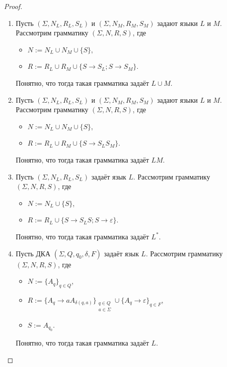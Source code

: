 \documentclass[12pt,a4paper]{article}
\begin{document}
    \begin{proof}
        \begin{enumerate}
            \item Пусть $(\Sigma, N_L, R_L, S_L)$ и $(\Sigma, N_M, R_M, S_M)$ задают языки $L$ и $M$. Рассмотрим грамматику $(\Sigma, N, R, S)$, где
                \begin{itemize}
                    \item $N := N_L \cup N_M \cup \{S\}$,
                    \item $R := R_L \cup R_M \cup \{S \to S_L; S \to S_M\}$.
                \end{itemize}
                Понятно, что тогда такая грамматика задаёт $L \cup M$.
            \item Пусть $(\Sigma, N_L, R_L, S_L)$ и $(\Sigma, N_M, R_M, S_M)$ задают языки $L$ и $M$. Рассмотрим грамматику $(\Sigma, N, R, S)$, где
                \begin{itemize}
                    \item $N := N_L \cup N_M \cup \{S\}$,
                    \item $R := R_L \cup R_M \cup \{S \to S_L S_M\}$.
                \end{itemize}
                Понятно, что тогда такая грамматика задаёт $LM$.
            \item Пусть $(\Sigma, N_L, R_L, S_L)$ задаёт язык $L$. Рассмотрим грамматику $(\Sigma, N, R, S)$, где
                \begin{itemize}
                    \item $N := N_L \cup \{S\}$,
                    \item $R := R_L \cup \{S \to S_L S; S \to \varepsilon\}$.
                \end{itemize}
                Понятно, что тогда такая грамматика задаёт $L^*$.
            \item Пусть ДКА $(\Sigma, Q, q_0, \delta, F)$ задаёт язык $L$. Рассмотрим грамматику $(\Sigma, N, R, S)$, где
                \begin{itemize}
                    \item $N := \{A_q\}_{q \in Q}$,
                    \item $R := \{A_q \to a A_{\delta(q, a)}\}_{\substack{q \in Q\\a \in \Sigma}} \cup \{A_q \to \varepsilon\}_{q \in F}$,
                    \item $S := A_{q_0}$.
                \end{itemize}
                Понятно, что тогда такая грамматика задаёт $L$.
        \end{enumerate}
    \end{proof}
\end{document}
